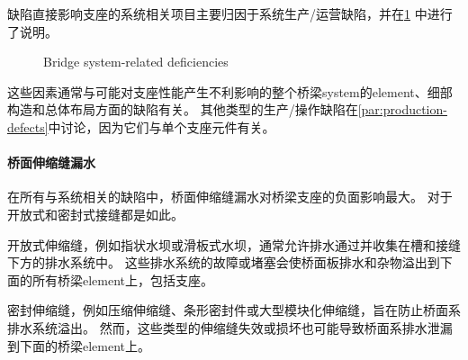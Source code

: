 缺陷直接影响支座的系统相关项目主要归因于系统生产/运营缺陷，并在\cref{fig:system-related-deficiency} 中进行了说明。

\begin{figure}
  \caption{Bridge system-related deficiencies}
  \label{fig:system-related-deficiency}
\end{figure}

这些因素通常与可能对支座性能产生不利影响的整个桥梁\gls*{system}的\gls*{element}、细部构造和总体布局方面的缺陷有关。 其他类型的生产/操作缺陷在\cref{par:production-defects}中讨论，因为它们与单个支座元件有关。

\paragraph{桥面伸缩缝漏水}
在所有与系统相关的缺陷中，桥面伸缩缝漏水对桥梁支座的负面影响最大。 对于开放式和密封式接缝都是如此。

开放式伸缩缝，例如指状水坝或滑板式水坝，通常允许排水通过并收集在槽和接缝下方的排水系统中。 这些排水系统的故障或堵塞会使桥面板排水和杂物溢出到下面的所有桥梁\gls*{element}上，包括支座。

密封伸缩缝，例如压缩伸缩缝、条形密封件或大型模块化伸缩缝，旨在防止桥面系排水系统溢出。 然而，这些类型的伸缩缝失效或损坏也可能导致桥面系排水泄漏到下面的桥梁\gls*{element}上。

